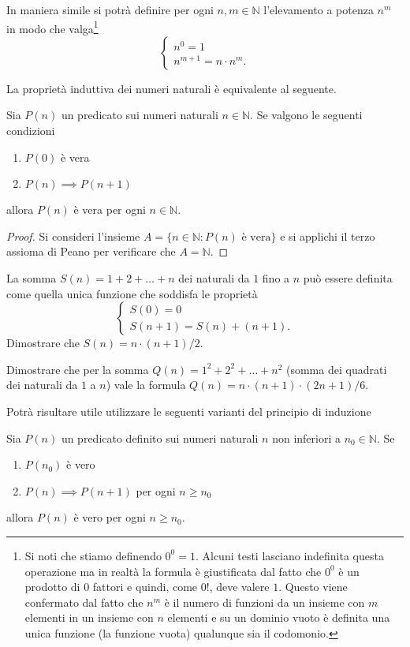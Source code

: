 \documentclass[italian,a4paper,hidelinks,headinclude]{scrartcl}
\newcommand{\NN}{{\mathbb N}}
\begin{document}
In maniera simile si potrà definire per ogni $n,m \in \NN$ l'elevamento a potenza $n^m$
in modo che valga\footnote{%
Si noti che stiamo definendo $0^0=1$.
Alcuni testi lasciano indefinita questa operazione ma in realtà la formula
è giustificata dal fatto che $0^0$ è un prodotto di $0$ fattori e quindi,
come $0!$, deve valere $1$.
Questo viene confermato dal fatto che $n^m$ è il numero di funzioni da un
insieme con $m$ elementi in un insieme con $n$ elementi e
su un dominio vuoto è definita una unica funzione (la funzione vuota)
qualunque sia il codomonio.
}
\[
\begin{cases}
  n^0 = 1\\
  n^{m+1} = n\cdot n^m.
\end{cases}
\]

La proprietà induttiva dei numeri naturali è equivalente al seguente.
\begin{theorem}
Sia $P(n)$ un predicato sui numeri naturali $n\in \NN$.
Se valgono le seguenti condizioni
\begin{enumerate}
\item $P(0)$ è vera
\item $P(n) \implies P(n+1)$
\end{enumerate}
allora $P(n)$ è vera per ogni $n\in \NN$.
\end{theorem}
%
\begin{proof}
Si consideri l'insieme $A=\{n\in \NN\colon \text{$P(n)$ è vera}\}$ e si
applichi il terzo assioma di Peano per verificare che $A=\NN$.
\end{proof}


\begin{exercise}
La somma $S(n) = 1 + 2 + \dots +n$
dei naturali da $1$ fino a $n$ può essere definita come quella unica funzione
che soddisfa le proprietà
\[
\begin{cases}
  S(0) = 0 \\
  S(n+1) = S(n) + (n+1).
\end{cases}
\]
Dimostrare che $S(n) = n \cdot (n+1) / 2$.
\end{exercise}

\begin{exercise}
Dimostrare che per la somma
$Q(n) = 1^2 + 2^2 + \dots + n^2$
(somma dei quadrati dei naturali da $1$ a $n$)
vale la formula
$Q(n) = n \cdot (n+1)\cdot (2n + 1) / 6$.
\end{exercise}

Potrà risultare utile utilizzare le seguenti varianti del principio di
induzione
\begin{theorem}
Sia $P(n)$ un predicato definito sui numeri naturali $n$
non inferiori a $n_0\in \NN$.
Se
\begin{enumerate}
\item $P(n_0)$ è vero
\item $P(n) \implies P(n+1)$ per ogni $n\ge n_0$
\end{enumerate}
allora $P(n)$ è vero per ogni $n\ge n_0$.
\end{theorem}
\end{document}
